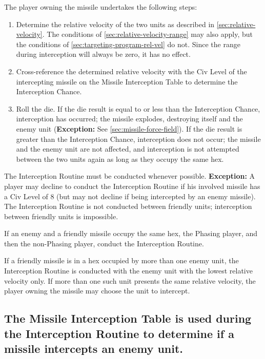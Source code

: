 The player owning the missile undertakes the following steps: 

\begin{enumerate}
\item Determine the relative velocity of the two units as described in
  \ref{sec:relative-velocity}. The conditions of
  \ref{sec:relative-velocity-range} may also apply, but the conditions
  of \ref{sec:targeting-program-rel-vel} do not. Since the range
  during interception will always be zero, it has no effect.
\item Cross-reference the determined relative velocity with the Civ
  Level of the intercepting missile on the Missile Interception Table
  to determine the Interception Chance.
\item Roll the die. If the die result is equal to or less than the
  Interception Chance, interception has occurred; the missile
  explodes, destroying itself and the enemy unit (\textbf{Exception:}
  See \ref{sec:missile-force-field}). If the die result is greater than the
  Interception Chance, interception does not occur; the missile and
  the enemy unit are not affected, and interception is not attempted
  between the two units again as long as they occupy the same hex.
\end{enumerate}

The Interception Routine must be conducted whenever possible.
\textbf{Exception:} A player may decline to conduct the Interception
Routine if his involved missile has a Civ Level of 8 (but may not
decline if being intercepted by an enemy missile). The Interception
Routine is not conducted between friendly units; interception between
friendly units is impossible.

If an enemy and a friendly missile occupy the same hex, the Phasing
player, and then the non-Phasing player, conduct the Interception
Routine.

If a friendly missile is in a hex occupied by more than one enemy
unit, the Interception Routine is conducted with the enemy unit with
the lowest relative velocity only. If more than one such unit presents
the same relative velocity, the player owning the missile may choose
the unit to intercept.

\subsection[Missile Interception Table]{The Missile Interception Table
  is used during the Interception Routine to determine if a missile
  intercepts  
  an enemy unit.}
\label{sec:missile-interception-table}

